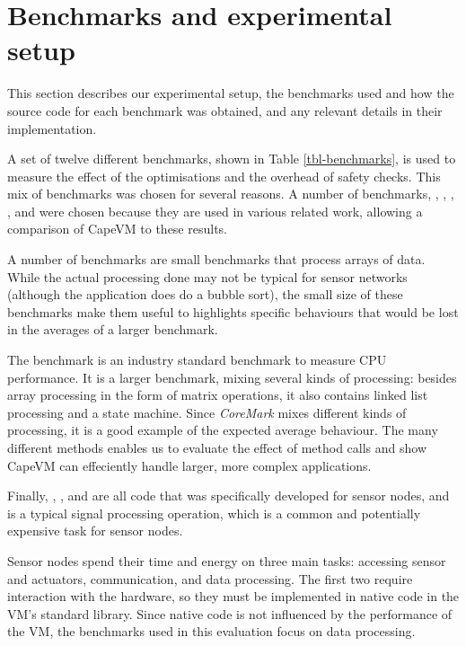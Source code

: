 
\section{Benchmarks and experimental setup}
\label{sec-evaluation-benchmarks}

This section describes our experimental setup, the benchmarks used and how the source code for each benchmark was obtained, and any relevant details in their implementation.

A set of twelve different benchmarks, shown in Table \ref{tbl-benchmarks}, is used to measure the effect of the optimisations and the overhead of safety checks. This mix of benchmarks was chosen for several reasons. A number of benchmarks, , , , , and  were chosen because they are used in various related work, allowing a comparison of CapeVM to these results.

A number of benchmarks are small benchmarks that process arrays of data. While the actual processing done may not be typical for sensor networks (although the  application does do a bubble sort), the small size of these benchmarks make them useful to highlights specific behaviours that would be lost in the averages of a larger benchmark.

The  benchmark is an industry standard benchmark to measure CPU performance. It is a larger benchmark, mixing several kinds of processing: besides array processing in the form of matrix operations, it also contains linked list processing and a state machine. Since \emph{CoreMark} mixes different kinds of processing, it is a good example of the expected average behaviour. The many different methods enables us to evaluate the effect of method calls and show CapeVM can effeciently handle larger, more complex applications.

Finally, , ,  and  are all code that was specifically developed for sensor nodes, and  is a typical signal processing operation, which is a common and potentially expensive task for sensor nodes.

Sensor nodes spend their time and energy on three main tasks: accessing sensor and actuators, communication, and data processing. The first two require interaction with the hardware, so they must be implemented in native code in the VM's standard library. Since native code is not influenced by the performance of the VM, the benchmarks used in this evaluation focus on data processing.

